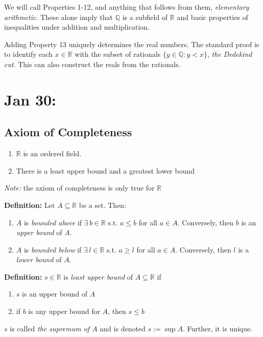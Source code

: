 \documentclass[12pt]{report}
\newcommand{\R}{\mathbb{R}}
\newcommand{\Q}{\mathbb{Q}}
\begin{document}
        We will call Properties 1-12, and anything that follows from them, \emph{elementary arithmetic}. These alone imply that $\Q$ is a subfield of $\R$ and basic properties of inequalities under addition and multiplication. 

        Adding Property 13 uniquely determines the real numbers. The standard proof is to identify each $x \in \R$ with the subset of rationals $\{y \in \Q: y < x\}$, \emph{the Dedekind cut}. This can also construct the reals from the rationals. 

\section{Jan 30:}
    \subsection*{Axiom of Completeness} 
        \begin{enumerate}
            \item $\R$ is an ordered field. 
            \item There is a least upper bound and a greatest lower bound 
        \end{enumerate}

        \emph{Note:} the axiom of completeness is only true for $\R$

        \textbf{Definition:} Let $A \subseteq \R$ be a set. Then: 
        \begin{enumerate}
            \item $A$ is \emph{bounded above} if $\exists\, b \in \R$ s.t. $a \leq b$ for all $a \in A$. Conversely, then $b$ is an \emph{upper bound} of $A$. 
            \item $A$ is \emph{bounded below} if $\exists\, l \in \R$ s.t. $a \geq l$ for all $a \in A$. Conversely, then $l$ is a \emph{lower bound} of $A$.
        \end{enumerate}

        \textbf{Definition:} $s \in \R$ is \emph{least upper bound} of $A \subseteq \R$ if
        \begin{enumerate}
            \item $s$ is an upper bound of $A$
            \item if $b$ is any upper bound for $A$, then $s \leq b$
        \end{enumerate} 

        $s$ is called \emph{the supremum of $A$} and is denoted $s := \sup A$. Further, it is unique. 
\end{document}
